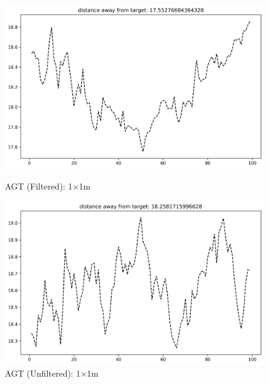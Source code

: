 \documentclass[runningheads]{llncs}
\begin{document}
\begin{figure}[H]
	\centering
	\begin{minipage}{0.49\textwidth}
		\centering
		\includegraphics[width=\textwidth]{figures/filtered/knn_custom_1.png}
		\caption*{AGT (Filtered): 1×1m}
	\end{minipage}
	\hfill
	\begin{minipage}{0.49\textwidth}
		\centering
		\includegraphics[width=\textwidth]{figures/unfiltered/knn_custom_1.png}
		\caption*{AGT (Unfiltered): 1×1m}
	\end{minipage}
\end{figure}
\end{document}
